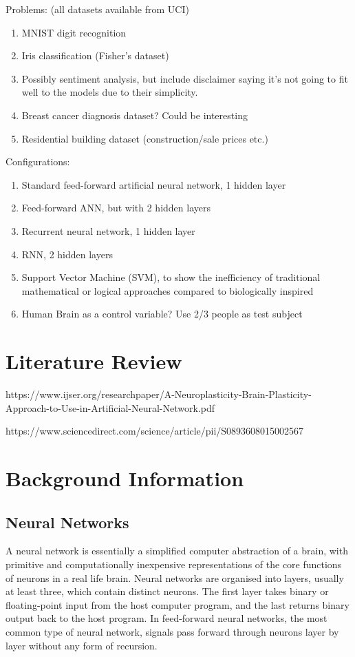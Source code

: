 \documentclass[]{report}
\begin{document}
Problems: (all datasets available from UCI)
\begin{enumerate}
	\item MNIST digit recognition
	\item Iris classification (Fisher's dataset)
	\item Possibly sentiment analysis, but include disclaimer saying it's not going to fit well to the models due to their simplicity.
	\item Breast cancer diagnosis dataset? Could be interesting
	\item Residential building dataset (construction/sale prices etc.)
\end{enumerate}

Configurations:
\begin{enumerate}
	\item Standard feed-forward artificial neural network, 1 hidden layer
	\item Feed-forward ANN, but with 2 hidden layers
	\item Recurrent neural network, 1 hidden layer
	\item RNN, 2 hidden layers
	\item Support Vector Machine (SVM), to show the inefficiency of traditional mathematical or logical approaches compared to biologically inspired
	\item Human Brain as a control variable? Use 2/3 people as test subject
\end{enumerate}

\section{Literature Review}

https://www.ijser.org/researchpaper/A-Neuroplasticity-Brain-Plasticity-Approach-to-Use-in-Artificial-Neural-Network.pdf

https://www.sciencedirect.com/science/article/pii/S0893608015002567


\section{Background Information}

\subsection{Neural Networks}
A neural network is essentially a simplified computer abstraction of a brain, with primitive and computationally inexpensive representations of the core functions of neurons in a real life brain. Neural networks are organised into layers, usually at least three, which contain distinct neurons. The first layer takes binary or floating-point input from the host computer program, and the last returns binary output back to the host program. In feed-forward neural networks, the most common type of neural network, signals pass forward through neurons layer by layer without any form of recursion.
\end{document}
